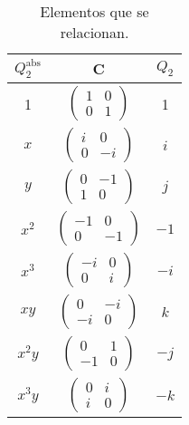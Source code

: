 \begin{ejemplo}
    \begin{table}[H]
    \centering
    \begin{tabular}{c|c|c}
        $Q_2^{\text{abs}}$ & C & $Q_2$ \\
        \hline
        1 & $\left(\begin{array}{cc}
            1 & 0 \\
            0 & 1 
    \end{array}\right)$  & 1 \\
        $x$ & $\left(\begin{array}{cc}
            i & 0 \\
            0 & -i 
    \end{array}\right)$& $i$ \\
        $y$ & $\left(\begin{array}{cc}
            0 & -1 \\
            1 & 0 
    \end{array}\right)$& $j$ \\
        $x^2$ & $\left(\begin{array}{cc}
            -1 & 0 \\
            0 & -1 
    \end{array}\right)$ & $-1$ \\
        $x^3$ & $\left(\begin{array}{cc}
            -i & 0 \\
            0 & i 
    \end{array}\right)$ & $-i$ \\
        $xy$ & $\left(\begin{array}{cc}
            0 & -i \\
            -i & 0 
    \end{array}\right)$ & $k$ \\
        $x^2y$ & $\left(\begin{array}{cc}
            0 & 1 \\
            -1 & 0 
    \end{array}\right)$ & $-j$ \\
        $x^3y$ & $\left(\begin{array}{cc}
            0 & i \\
             i &  0
     \end{array}\right)$ & $-k$
    \end{tabular}
    \caption{Elementos que se relacionan.}
    \label{tab:elementos_relacionados}
    \end{table}
\end{ejemplo}

